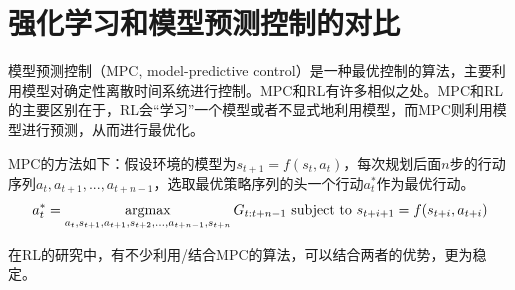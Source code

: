   \section{强化学习和模型预测控制的对比}
  模型预测控制\cite{MPC}（MPC, model-predictive control）是一种最优控制的算法，主要利用模型对确定性离散时间系统进行控制。MPC和RL有许多相似之处。MPC和RL的主要区别在于，RL会``学习''一个模型或者不显式地利用模型，而MPC则利用模型进行预测，从而进行最优化\cite{MPC_VS_RL}。\par
  MPC的方法如下：假设环境的模型为$s_{t+1} = f(s_t, a_t)$，每次规划后面$n$步的行动序列$a_t, a_{t+1}, ..., a_{t+n-1}$，选取最优策略序列的头一个行动$a_t^*$作为最优行动。
  \begin{align}
  \begin{aligned}
        a_t^* = \operatorname*{argmax}_{a_t, s_{t+1}, a_{t+1}, s_{t+2}, ... , a_{t+n-1}, s_{t+n}} G_{t:t+n-1}
    \text{  subject to } s_{t+i+1} = f(s_{t+i}, a_{t+i})
  \end{aligned}
  \end{align}
  \par 在RL的研究中，有不少利用/结合MPC的算法，可以结合两者的优势，更为稳定。
  
